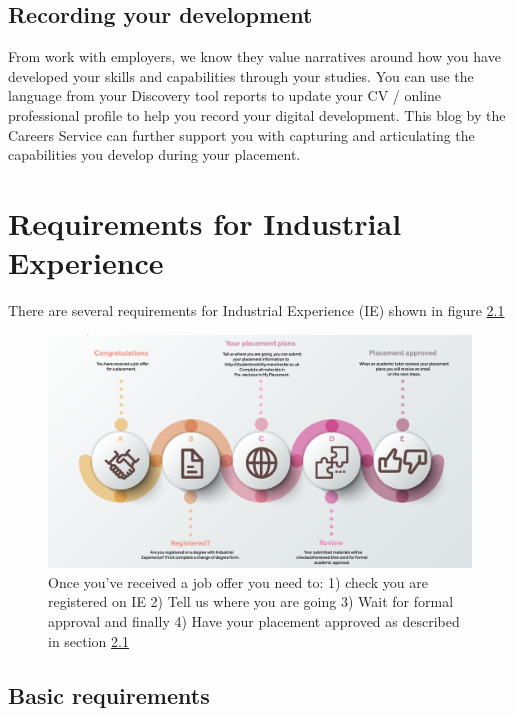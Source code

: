\documentclass[
]{book}
\begin{document}
\section{Recording your development}\label{development}

From work with employers, we know they value narratives around how you have developed your skills and capabilities through your studies. You can use the language from your Discovery tool reports to update your CV / online professional profile to help you record your digital development. This blog by the Careers Service can further support you with capturing and articulating the capabilities you develop during your placement. \citep{conway}

\chapter{Requirements for Industrial Experience}\label{requirements}

There are several requirements for Industrial Experience (IE) shown in figure \ref{fig:plans-fig}

\begin{figure}

{\centering \includegraphics[width=1\linewidth]{images/plans} 

}

\caption{Once you've received a job offer you need to: 1) check you are registered on IE 2) Tell us where you are going 3) Wait for formal approval and finally 4) Have your placement approved as described in section \ref{basic}}\label{fig:plans-fig}
\end{figure}



\section{Basic requirements}\label{basic}
\end{document}
